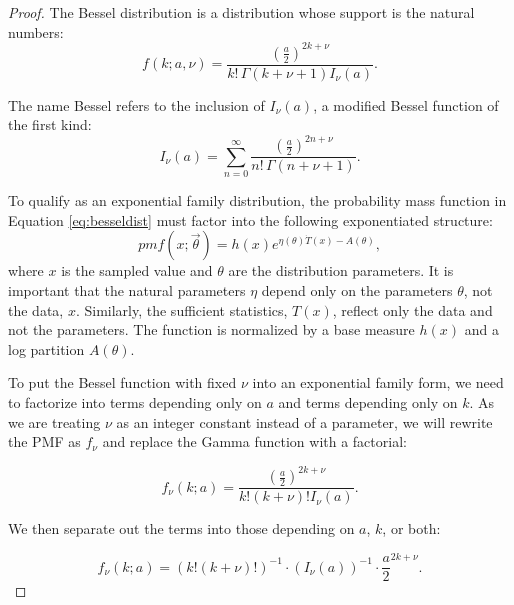 \documentclass{article}
\begin{document}
   \begin{proof}
   The Bessel distribution \cite{yuan2000bessel} is a distribution whose support is the natural numbers:
     \begin{equation}
     f(k; a, \nu) = \frac{\left(\frac{a}{2}\right)^{2k+\nu}}{k!\, \Gamma(k + \nu + 1) I_\nu(a)}.
     \label{eq:besseldist}
     \end{equation}
   
   The name Bessel refers to the inclusion of $I_\nu(a)$, a modified Bessel function of the
     first kind:
     \begin{equation}
     I_\nu(a) = \sum_{n=0}^\infty
     \frac{\left(\frac{a}{2}\right)^{2n+\nu}}{n!\, \Gamma(n +\nu + 1)}.
       \end{equation}
   
   To qualify as an exponential family distribution, the probability mass function in Equation \ref{eq:besseldist} must factor into the following exponentiated structure:
   \begin{equation}
       pmf(x; \vec{\theta}) = h(x) e^{\eta(\theta) \dot T(x) - A(\theta)},
   \end{equation}
   where $x$ is the sampled value and $\theta$ are the distribution parameters.
   It is important that the natural parameters $\eta$ depend only on the parameters $\theta$, not the data, $x$.
   Similarly, the sufficient statistics, $T(x)$, reflect only the data and not the parameters.
   The function is normalized by a base measure $h(x)$ and a log partition $A(\theta)$.
   
   To put the Bessel function with fixed $\nu$ into an exponential family form, we need to factorize into terms depending only on $a$ and terms depending only on $k$.
   As we are treating $\nu$ as an integer constant instead of a parameter, we will rewrite the PMF as $f_{\nu}$ and replace the Gamma function with a factorial:
   
   \begin{equation}
       f_{\nu}(k; a) = \frac{\left(\frac{a}{2}\right)^{2k+\nu}}{k! (k + \nu)! I_\nu(a)}.
   \end{equation}
   
   We then separate out the terms into those depending on $a$, $k$, or both:
   
   \begin{equation}
       f_{\nu}(k; a) = (k!(k + \nu)!)^{-1} \cdot (I_{\nu}(a))^{-1} \cdot \frac{a}{2}^{2k + \nu}.
   \end{equation}
   

\end{proof}
\end{document}
